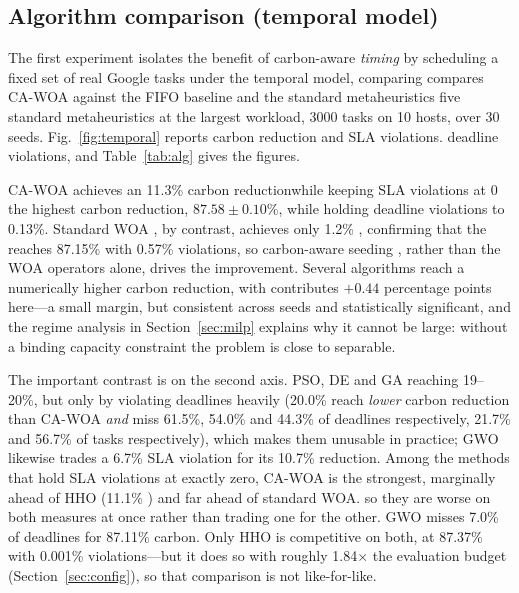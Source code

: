 \documentclass[12pt,a4paper]{article}
\providecommand{\DIFaddtex}[1]{{\protect\color{blue} \sf #1}} %
\providecommand{\DIFdeltex}[1]{{\protect\color{red} \scriptsize #1}} %
\providecommand{\DIFaddbegin}{} %
\providecommand{\DIFaddend}{} %
\providecommand{\DIFdelbegin}{} %
\providecommand{\DIFdelend}{} %
\providecommand{\DIFadd}[1]{\texorpdfstring{\DIFaddtex{#1}}{#1}} %
\providecommand{\DIFdel}[1]{\texorpdfstring{\DIFdeltex{#1}}{}} %
\providecommand{\DIFscaledelfig}{0.5}
\newlength{\DIFdelgraphicswidth} %
\newlength{\DIFdelgraphicsheight} %
\providecommand{\DIFaddincludegraphics}[2][]{{\color{blue}\fbox{\DIFOincludegraphics[#1]{#2}}}} %
\providecommand{\DIFdelincludegraphics}[2][]{%
\sbox{\DIFdelgraphicsbox}{\DIFOincludegraphics[#1]{#2}}%
\settoboxwidth{\DIFdelgraphicswidth}{\DIFdelgraphicsbox} %
\settoboxtotalheight{\DIFdelgraphicsheight}{\DIFdelgraphicsbox} %
\scalebox{\DIFscaledelfig}{%
\parbox[b]{\DIFdelgraphicswidth}{\usebox{\DIFdelgraphicsbox}\\[-\baselineskip] \rule{\DIFdelgraphicswidth}{0em}}\llap{\resizebox{\DIFdelgraphicswidth}{\DIFdelgraphicsheight}{%
\setlength{\unitlength}{\DIFdelgraphicswidth}%
\begin{picture}(1,1)%
\thicklines\linethickness{2pt} %
{\color[rgb]{1,0,0}\put(0,0){\framebox(1,1){}}}%
{\color[rgb]{1,0,0}\put(0,0){\line( 1,1){1}}}%
{\color[rgb]{1,0,0}\put(0,1){\line(1,-1){1}}}%
\end{picture}%
}\hspace*{3pt}}} %
} %
\DeclareRobustCommand{\DIFaddbegin}{\DIFOaddbegin \let\includegraphics\DIFaddincludegraphics} %
\DeclareRobustCommand{\DIFaddend}{\DIFOaddend \let\includegraphics\DIFOincludegraphics} %
\DeclareRobustCommand{\DIFdelbegin}{\DIFOdelbegin \let\includegraphics\DIFdelincludegraphics} %
\DeclareRobustCommand{\DIFdelend}{\DIFOaddend \let\includegraphics\DIFOincludegraphics} %
\begin{document}
\subsection{Algorithm comparison (temporal model)}
The first experiment \DIFdelbegin \DIFdel{isolates the benefit of carbon-aware \emph{timing} by scheduling a fixed set of real
Google tasks under the temporal model, comparing }\DIFdelend \DIFaddbegin \DIFadd{compares }\DIFaddend CA-WOA against the FIFO baseline and the \DIFdelbegin \DIFdel{standard
metaheuristics}\DIFdelend \DIFaddbegin \DIFadd{five standard metaheuristics at the
largest workload, 3000 tasks on 10 hosts, over 30 seeds}\DIFaddend . Fig.~\ref{fig:temporal} reports carbon reduction and
\DIFdelbegin \DIFdel{SLA violations. }\DIFdelend \DIFaddbegin \DIFadd{deadline violations, and Table~\ref{tab:alg} gives the figures.
}

\DIFaddend CA-WOA achieves \DIFdelbegin \DIFdel{an
11.3\% carbon reductionwhile keeping SLA violations at 0}\DIFdelend \DIFaddbegin \DIFadd{the highest carbon reduction, $87.58 \pm 0.10$\%, while holding deadline violations to
0.13}\DIFaddend \%. Standard WOA \DIFdelbegin \DIFdel{, by contrast, achieves only 1.2\% ,
confirming that the }\DIFdelend \DIFaddbegin \DIFadd{reaches 87.15\% with 0.57\% violations, so }\DIFaddend carbon-aware seeding \DIFdelbegin \DIFdel{, rather than the WOA operators alone, drives the
improvement. Several
algorithms reach a numerically higher carbon reduction, with }\DIFdelend \DIFaddbegin \DIFadd{contributes $+0.44$
percentage points here---a small margin, but consistent across seeds and statistically significant, and the
regime analysis in Section~\ref{sec:milp} explains why it cannot be large: without a binding capacity
constraint the problem is close to separable.
}

\DIFadd{The important contrast is on the second axis. }\DIFaddend PSO, DE and GA \DIFdelbegin \DIFdel{reaching 19--20\%, but only by
violating deadlines heavily (20.0\% }\DIFdelend \DIFaddbegin \DIFadd{reach \emph{lower} carbon reduction than CA-WOA
\emph{and} miss 61.5\%, 54.0\% and 44.3\% of deadlines respectively}\DIFaddend , \DIFdelbegin \DIFdel{21.7\% and 56.7\% of tasks respectively), which makes them unusable in
practice; GWO likewise trades a 6.7\% SLA violation for its 10.7\% reduction. Among the methods that hold SLA
violations at exactly zero, CA-WOA is
the strongest, marginally ahead of HHO (11.1\% ) and far ahead of
standard WOA.
}\DIFdelend \DIFaddbegin \DIFadd{so they are worse on both measures at
once rather than trading one for the other. GWO misses 7.0\% of deadlines for 87.11\% carbon. Only HHO is
competitive on both, at 87.37\% with 0.001\% violations---but it does so with roughly 1.84$\times$ the
evaluation budget (Section~\ref{sec:config}), so that comparison is not like-for-like.
}
\end{document}
